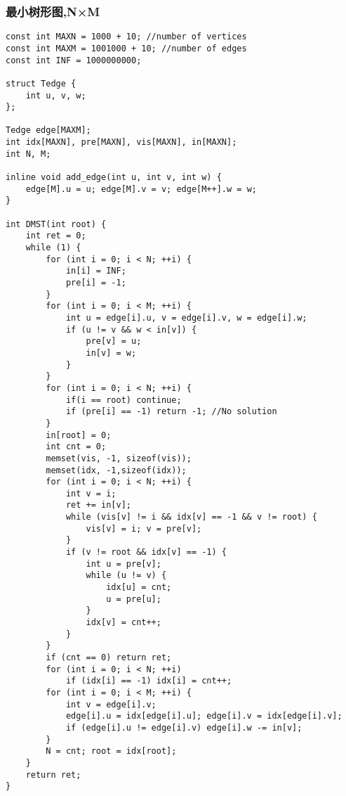 \subsubsection{最小树形图,N×M}
\begin{verbatim}
const int MAXN = 1000 + 10; //number of vertices
const int MAXM = 1001000 + 10; //number of edges
const int INF = 1000000000;

struct Tedge {
	int u, v, w;
};

Tedge edge[MAXM];
int idx[MAXN], pre[MAXN], vis[MAXN], in[MAXN];
int N, M;

inline void add_edge(int u, int v, int w) {
	edge[M].u = u; edge[M].v = v; edge[M++].w = w;
}

int DMST(int root) {
	int ret = 0;
	while (1) {
		for (int i = 0; i < N; ++i) {
			in[i] = INF;
			pre[i] = -1;
		}
		for (int i = 0; i < M; ++i) {
			int u = edge[i].u, v = edge[i].v, w = edge[i].w;
			if (u != v && w < in[v]) {
				pre[v] = u;
				in[v] = w;
			}
		}
		for (int i = 0; i < N; ++i) {
			if(i == root) continue;
			if (pre[i] == -1) return -1; //No solution
		}
		in[root] = 0;
		int cnt = 0;
		memset(vis, -1, sizeof(vis));
		memset(idx, -1,sizeof(idx));
		for (int i = 0; i < N; ++i) {
			int v = i;
			ret += in[v];
			while (vis[v] != i && idx[v] == -1 && v != root) {
				vis[v] = i; v = pre[v];
			}
			if (v != root && idx[v] == -1) {
				int u = pre[v];
				while (u != v) {
					idx[u] = cnt;
					u = pre[u];
				}
				idx[v] = cnt++;
			}
		}
		if (cnt == 0) return ret;
		for (int i = 0; i < N; ++i)
			if (idx[i] == -1) idx[i] = cnt++;
		for (int i = 0; i < M; ++i) {
			int v = edge[i].v;
			edge[i].u = idx[edge[i].u]; edge[i].v = idx[edge[i].v];
			if (edge[i].u != edge[i].v) edge[i].w -= in[v];
		}
		N = cnt; root = idx[root];
	}
	return ret;
}
\end{verbatim}
